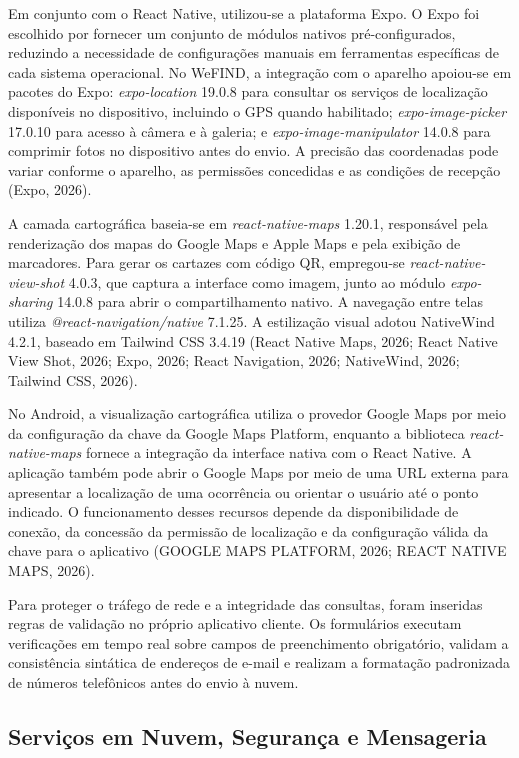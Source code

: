 Em conjunto com o React Native, utilizou-se a plataforma Expo. O Expo foi escolhido por fornecer um conjunto de módulos nativos pré-configurados, reduzindo a necessidade de configurações manuais em ferramentas específicas de cada sistema operacional. No WeFIND, a integração com o aparelho apoiou-se em pacotes do Expo: \textit{expo-location} 19.0.8 para consultar os serviços de localização disponíveis no dispositivo, incluindo o GPS quando habilitado; \textit{expo-image-picker} 17.0.10 para acesso à câmera e à galeria; e \textit{expo-image-manipulator} 14.0.8 para comprimir fotos no dispositivo antes do envio. A precisão das coordenadas pode variar conforme o aparelho, as permissões concedidas e as condições de recepção (Expo, 2026).

A camada cartográfica baseia-se em \textit{react-native-maps} 1.20.1, responsável pela renderização dos mapas do Google Maps e Apple Maps e pela exibição de marcadores. Para gerar os cartazes com código QR, empregou-se \textit{react-native-view-shot} 4.0.3, que captura a interface como imagem, junto ao módulo \textit{expo-sharing} 14.0.8 para abrir o compartilhamento nativo. A navegação entre telas utiliza \textit{@react-navigation/native} 7.1.25. A estilização visual adotou NativeWind 4.2.1, baseado em Tailwind CSS 3.4.19 (React Native Maps, 2026; React Native View Shot, 2026; Expo, 2026; React Navigation, 2026; NativeWind, 2026; Tailwind CSS, 2026).

No Android, a visualização cartográfica utiliza o provedor Google Maps por meio da configuração da chave da Google Maps Platform, enquanto a biblioteca \textit{react-native-maps} fornece a integração da interface nativa com o React Native. A aplicação também pode abrir o Google Maps por meio de uma URL externa para apresentar a localização de uma ocorrência ou orientar o usuário até o ponto indicado. O funcionamento desses recursos depende da disponibilidade de conexão, da concessão da permissão de localização e da configuração válida da chave para o aplicativo (GOOGLE MAPS PLATFORM, 2026; REACT NATIVE MAPS, 2026).

Para proteger o tráfego de rede e a integridade das consultas, foram inseridas regras de validação no próprio aplicativo cliente. Os formulários executam verificações em tempo real sobre campos de preenchimento obrigatório, validam a consistência sintática de endereços de e-mail e realizam a formatação padronizada de números telefônicos antes do envio à nuvem.

\subsection{Serviços em Nuvem, Segurança e Mensageria}

